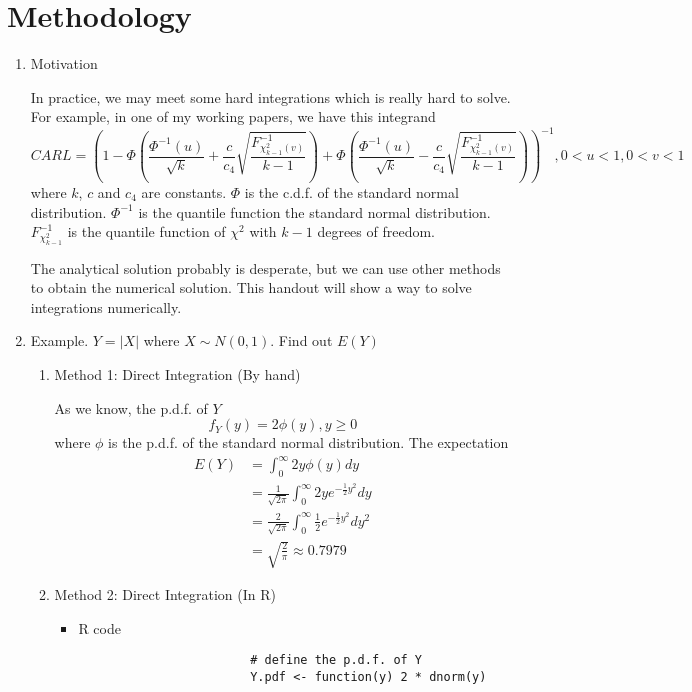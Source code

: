 \section{Methodology}
\begin{enumerate}
	\item Motivation
	\par In practice, we may meet some hard integrations which is really hard to solve. For example, in one of my working papers, we have this integrand
		\begin{equation*}
			CARL = (1 - \Phi(\frac{\Phi^{-1}(u)}{\sqrt{k}} + \frac{c}{c_4}\sqrt{\frac{F^{-1}_{\chi^2_{k-1}(v)}}{k-1}}) + \Phi(\frac{\Phi^{-1}(u)}{\sqrt{k}} - \frac{c}{c_4}\sqrt{\frac{F^{-1}_{\chi^2_{k-1}(v)}}{k-1}}))^{-1}, 0<u<1, 0<v<1
		\end{equation*}
		where $k$, $c$ and $c_4$ are constants. $\Phi$ is the c.d.f. of the standard normal distribution. $\Phi^{-1}$ is the quantile function the standard normal distribution. $F^{-1}_{\chi^2_{k-1}}$ is the quantile function of $\chi^2$ with $k-1$ degrees of freedom. 
		\par The analytical solution probably is desperate, but we can use other methods to obtain the numerical solution. This handout will show a way to solve integrations numerically.
	
	\item Example. $Y = |X|$ where $X \sim N(0, 1)$. Find out $E(Y)$
		\begin{enumerate}
			\item Method 1: Direct Integration (By hand)
				\par As we know, the p.d.f. of $Y$
				\begin{equation*}
					f_Y(y) = 2\phi(y), y \ge 0
				\end{equation*}
				where $\phi$ is the p.d.f. of the standard normal distribution. The expectation
				\begin{equation*}
					\begin{split}
						E(Y) &= \int_{0}^{\infty} 2y\phi(y) dy \\
						& = \frac{1}{\sqrt{2\pi}}\int_{0}^{\infty} 2y e^{-\frac{1}{2}y^2}dy \\
						& = \frac{2}{\sqrt{2\pi}}\int_{0}^{\infty} \frac{1}{2} e^{-\frac{1}{2}y^2}dy^2 \\
						& = \sqrt{\frac{2}{\pi}} \approx 0.7979
					\end{split}
				\end{equation*}
			\item Method 2: Direct Integration (In R)
				\begin{itemize}
					\item R code
					\begin{verbatim}
						# define the p.d.f. of Y
						Y.pdf <- function(y) 2 * dnorm(y)
						

\end{verbatim}
\end{itemize}
\end{enumerate}
\end{enumerate}
